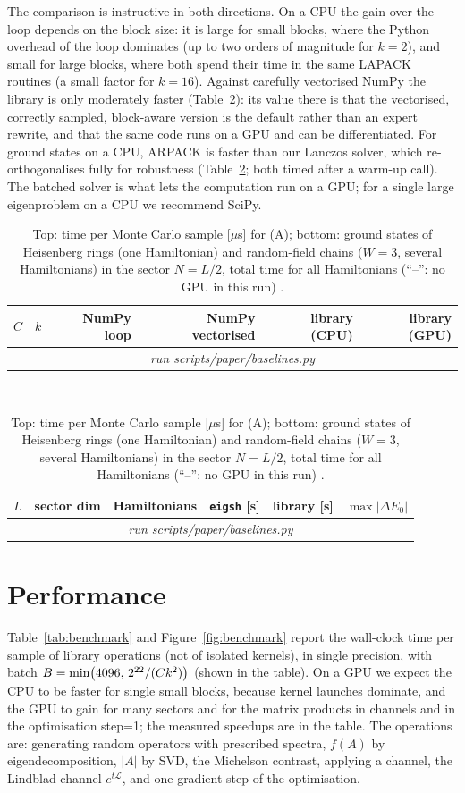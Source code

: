 \documentclass[11pt]{article}
\providecommand{\BenchHasGPU}{0}
\providecommand{\BaseMCRows}{\multicolumn{6}{c}{\emph{run scripts/paper/baselines.py}}\\}
\providecommand{\BaseGSRows}{\multicolumn{6}{c}{\emph{run scripts/paper/baselines.py}}\\}
\begin{document}
The comparison is instructive in both directions. On a CPU the gain over the loop depends on the block size: it is
large for small blocks, where the Python overhead of the loop dominates (up to two orders of magnitude for $k=2$),
and small for large blocks, where both spend their time in the same LAPACK routines (a small factor for $k=16$).
Against carefully vectorised NumPy the library is only moderately faster (Table~\ref{tab:baselines}): its value there is that the vectorised, correctly
sampled, block-aware version is the default rather than an expert rewrite, and that the same code runs on a GPU
and can be differentiated. For ground states on a CPU, ARPACK is faster than our Lanczos solver, which re-orthogonalises fully for
robustness (Table~\ref{tab:baselines}; both timed after a warm-up call). The batched solver is what lets the
computation run on a GPU; for a single large eigenproblem on a CPU we recommend SciPy.

\begin{table}[h]
\centering\small
\begin{tabular}{rrrrrr}
\toprule
$C$ & $k$ & NumPy loop & NumPy vectorised & library (CPU) & library (GPU)\\
\midrule
\BaseMCRows
\bottomrule
\end{tabular}\\[2mm]
\begin{tabular}{rrrrrr}
\toprule
$L$ & sector dim & Hamiltonians & \texttt{eigsh} [s] & library [s] & $\max|\Delta E_0|$\\
\midrule
\BaseGSRows
\bottomrule
\end{tabular}
\caption{Top: time per Monte Carlo sample [$\mu$s] for (A); bottom: ground states of Heisenberg rings
(one Hamiltonian) and random-field chains ($W=3$, several Hamiltonians) in the sector $N=L/2$, total time for all
Hamiltonians (``--'': no GPU in this run)
.}
\label{tab:baselines}
\end{table}

\section{Performance}\label{sec:performance}

Table~\ref{tab:benchmark} and Figure~\ref{fig:benchmark} report the wall-clock time per sample of library
operations (not of isolated kernels), in single precision, with batch $B=\min\bigl(4096,\,\IfFileExists{generated/benchmark.tex}{2^{\BenchTargetLog}}{2^{22}}/(Ck^2)\bigr)$ (shown in the table). On a GPU we expect the CPU to be faster for single small blocks, because
kernel launches dominate, and the GPU to gain for many sectors and for the matrix products in channels and in
the optimisation step\ifnum\BenchHasGPU=1; the measured speedups are in the table\fi. The operations are: generating
random operators with prescribed spectra, $f(A)$ by eigendecomposition, $|A|$ by SVD, the Michelson contrast, applying
a channel, the Lindblad channel $e^{t\mathcal L}$, and one gradient step of the optimisation.
\end{document}
